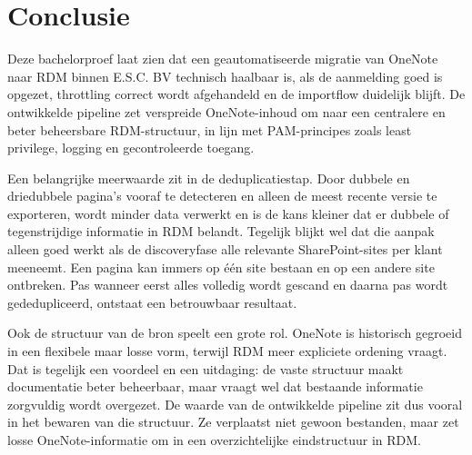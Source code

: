 
\chapter{Conclusie}%
\label{ch:conclusie}


Deze bachelorproef laat zien dat een geautomatiseerde migratie van OneNote naar RDM binnen E.S.C. BV technisch haalbaar is, als de aanmelding goed is opgezet, throttling correct wordt afgehandeld en de importflow duidelijk blijft. De ontwikkelde pipeline zet verspreide OneNote-inhoud om naar een centralere en beter beheersbare RDM-structuur, in lijn met PAM-principes zoals least privilege, logging en gecontroleerde toegang.

Een belangrijke meerwaarde zit in de deduplicatiestap. Door dubbele en driedubbele pagina's vooraf te detecteren en alleen de meest recente versie te exporteren, wordt minder data verwerkt en is de kans kleiner dat er dubbele of tegenstrijdige informatie in RDM belandt. Tegelijk blijkt wel dat die aanpak alleen goed werkt als de discoveryfase alle relevante SharePoint-sites per klant meeneemt. Een pagina kan immers op één site bestaan en op een andere site ontbreken. Pas wanneer eerst alles volledig wordt gescand en daarna pas wordt gededupliceerd, ontstaat een betrouwbaar resultaat.

Ook de structuur van de bron speelt een grote rol. OneNote is historisch gegroeid in een flexibele maar losse vorm, terwijl RDM meer expliciete ordening vraagt. Dat is tegelijk een voordeel en een uitdaging: de vaste structuur maakt documentatie beter beheerbaar, maar vraagt wel dat bestaande informatie zorgvuldig wordt overgezet. De waarde van de ontwikkelde pipeline zit dus vooral in het bewaren van die structuur. Ze verplaatst niet gewoon bestanden, maar zet losse OneNote-informatie om in een overzichtelijke eindstructuur in RDM.

